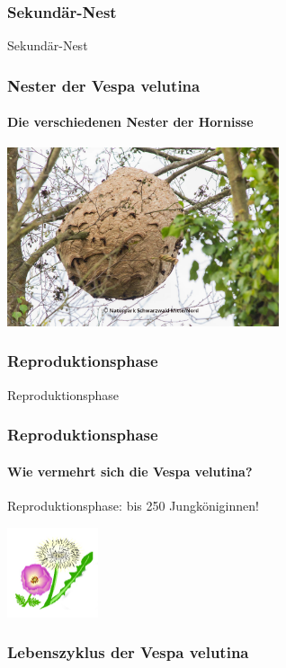 \documentclass[aspectratio=169]{beamer}
\begin{document}
\subsubsection[Sekundär-Nest]{Sekundär-Nest}

\begin{frame}{Sekundär-Nest}
	\frametitle{Nester der Vespa velutina} 
	\framesubtitle{Die verschiedenen Nester der Hornisse}
		\begin{center}	
			\includegraphics[width=0.6\textwidth]{figures/asiatische_hornisse1.jpg}
		\end{center}
		
\end{frame}


\subsubsection[Reproduktionsphase]{Reproduktionsphase}

\begin{frame}{Reproduktionsphase}
\frametitle{Reproduktionsphase} 
\framesubtitle{Wie vermehrt sich die Vespa velutina?}

\begin{examples}{Reproduktionsphase:  }{bis 250 Jungköniginnen!}
\begin{center}	
    \includegraphics[width=0.2\textwidth]{figures/BH-Logo_Quat.png}
\end{center}
\end{examples}
\end{frame}

\subsubsection{Lebenszyklus der Vespa velutina}
\end{document}
